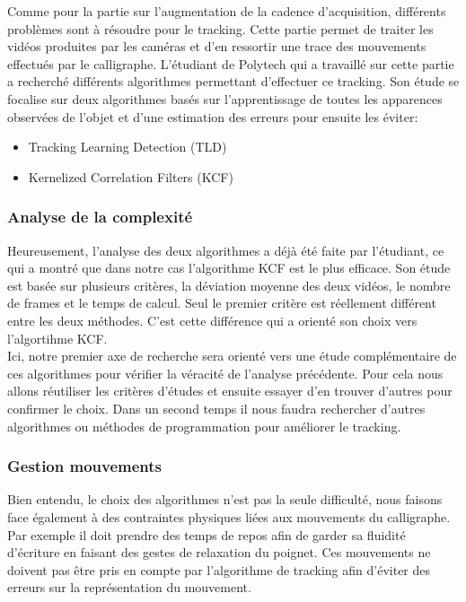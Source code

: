 Comme pour la partie sur l'augmentation de la cadence d'acquisition, différents problèmes sont à résoudre pour le tracking. Cette partie permet de traiter les vid\'eos produites par les cam\'eras et d'en ressortir une trace des mouvements effectu\'es par le calligraphe. L'\'etudiant de Polytech qui a travaill\'e sur cette partie a recherch\'e diff\'erents algorithmes permettant d'effectuer ce tracking. Son \'etude se focalise sur deux algorithmes bas\'es sur l'apprentissage de toutes les apparences observ\'ees de l'objet et d'une estimation des erreurs pour ensuite les \'eviter:

\begin{itemize}

\item Tracking Learning Detection (TLD)

\item Kernelized Correlation Filters (KCF)

\end{itemize}

  
\subsubsection{Analyse de la complexité}

Heureusement, l'analyse des deux algorithmes a déjà été faite par l'\'etudiant, ce qui a montr\'e que dans notre cas l'algorithme KCF est le plus efficace. Son \'etude est bas\'ee sur plusieurs crit\`eres, la d\'eviation moyenne des deux vid\'eos, le nombre de frames et le temps de calcul. Seul le premier critère est r\'eellement diff\'erent entre les deux m\'ethodes. C'est cette diff\'erence qui a orient\'e son choix vers l'algortihme KCF. \\

Ici, notre premier axe de recherche sera orient\'e vers une \'etude compl\'ementaire de ces algorithmes pour v\'erifier la v\'eracit\'e de l'analyse pr\'ec\'edente. Pour cela nous allons r\'eutiliser les crit\`eres d'\'etudes et ensuite essayer d'en trouver d'autres pour confirmer le choix. Dans un second temps il nous faudra rechercher d'autres algorithmes ou m\'ethodes de programmation pour am\'eliorer le tracking.

\subsubsection{Gestion mouvements}

Bien entendu, le choix des algorithmes n'est pas la seule difficulté, nous faisons face \'egalement à des contraintes physiques li\'ees aux mouvements du calligraphe. Par exemple il doit prendre des temps de repos afin de garder sa fluidit\'e d'\'ecriture en faisant des gestes de relaxation du poignet. Ces mouvements ne doivent pas \^etre pris en compte par l'algorithme de tracking afin d'\'eviter des erreurs sur la repr\'esentation du mouvement. \\

